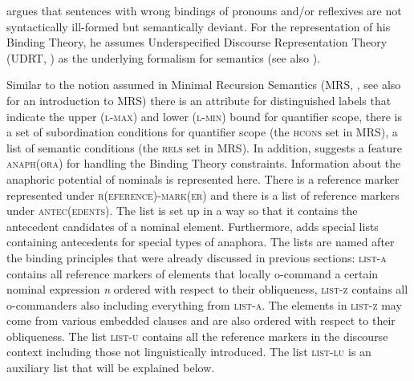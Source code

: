\documentclass[output=paper,biblatex,babelshorthands,newtxmath,draftmode,colorlinks,citecolor=brown]{langscibook}
\begin{document}
\citet{Branco2002a} argues that sentences with wrong bindings of pronouns and/or reflexives are not
syntactically ill-formed but semantically deviant. For the representation of his Binding Theory, he
assumes Underspecified Discourse Representation Theory (UDRT, \citealp{Reyle93b-u,FR95a-u}) as the
underlying formalism for semantics (see also
). 

Similar to the notion assumed in Minimal Recursion Semantics (MRS, \citealp*{CFPS2005a}, see also  for an introduction to MRS) there is an
attribute for distinguished labels that indicate the upper (\textsc{l-max}) and lower
(\textsc{l-min}) bound for quantifier scope, there is a set of subordination conditions for
quantifier scope (the \textsc{hcons} set in MRS), a list of semantic conditions (the \textsc{rels}
set in MRS). In addition, \citeauthor{Branco2002a} suggests a feature \textsc{anaph(ora)} for handling
the Binding Theory constraints. Information about the anaphoric potential of nominals is represented
here. There is a reference marker represented under \textsc{r(eference)-mark(er)} and there is a list
of reference markers under \textsc{antec(edents)}. The list is set up in a way so that it contains
the antecedent candidates of a nominal element. Furthermore, \citeauthor{Branco2002a} adds special
lists containing antecedents for special types of anaphora. The lists are named after the binding
principles that were already discussed in previous sections: \textsc{list-a} contains all reference
markers of elements that locally o-command a certain nominal expression \emph{n} ordered with
respect to their obliqueness, \textsc{list-z} contains all o-commanders also including everything
from \textsc{list-a}. The elements in \textsc{list-z} may come from various
embedded clauses and are also ordered with respect to their obliqueness. The list \textsc{list-u}
contains all the reference markers in the discourse context including those not linguistically
introduced. The list \textsc{list-lu} is an auxiliary list that will be explained below.
\ea
{}
\z
\end{document}
